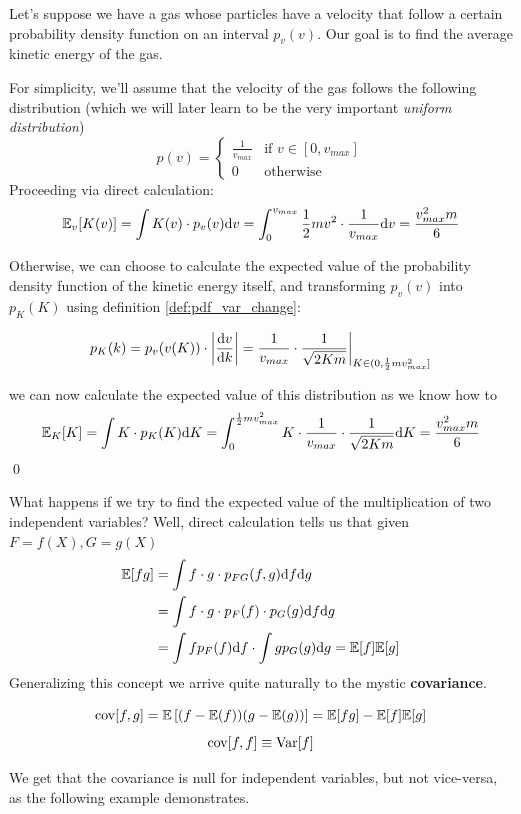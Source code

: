 \begin{example}
	Let's suppose we have a gas whose particles have a velocity that follow a certain probability density function on an interval $p_v(v)$. Our goal is to find the average kinetic energy of the gas. 
	
	For simplicity, we'll assume that the velocity of the gas follows the following distribution (which we will later learn to be the very important \emph{uniform distribution})
	\[
	p(v) = \begin{cases} \frac{1}{v_{max}} & \text{if } v \in [0,v_{max}] \\ 0 &  \text{otherwise} \end{cases}
	\]
	Proceeding via direct calculation:
	\[
	\mathbb{E}_v[K(v)] = \int K(v)\cdot p_v(v) \mathrm{d} v = \int_0^{v_{max}} \frac{1}{2}mv^2 \cdot \frac{1}{v_{max}} \mathrm{d} v = \frac{v_{max}^2m}{6}
	\]
	
	Otherwise, we can choose to calculate the expected value of the probability density function of the kinetic energy itself, and transforming $p_v(v)$ into $p_K(K)$ using definition \ref{def:pdf_var_change}:
	
	\[
	p_K(k) = p_v(v(K))\cdot \left| \frac{\mathrm{d} v}{\mathrm{d} k} \right| = \frac{1}{v_{max}}\cdot\frac{1}{\sqrt{2Km}}\bigg\rvert_{K\in(0,\frac{1}{2}mv_{max}^2]}
	\]
	
	we can now calculate the expected value of this distribution as we know how to
	\[
	\mathbb{E}_K[K] = \int K\cdot p_K(K) \mathrm{d} K = \int_0^{\frac{1}{2}mv_{max}^2} K \cdot \frac{1}{v_{max}}\cdot\frac{1}{\sqrt{2Km}} \mathrm{d} K = \frac{v_{max}^2m}{6}
	\]
	\qed
\end{example}

What happens if we try to find the expected value of the multiplication of two independent variables? Well, direct calculation tells us that given $F=f(X), G=g(X)$
\begin{align*}
	\mathbb{E}[fg] &= \int f\cdot g \cdot p_{FG}(f,g)\mathrm{d} f \mathrm{d} g \\
	&= \int f\cdot g \cdot p_F(f)\cdot p_G(g)\mathrm{d} f \mathrm{d} g \\
	&= \int f p_F(f) \mathrm{d} f \cdot\int g p_G(g)\mathrm{d} g = \mathbb{E}[f]\mathbb{E}[g]	
\end{align*}
Generalizing this concept we arrive quite naturally to the mystic \textbf{covariance}.
\begin{definition}[Covariance]
	\[
	\operatorname{cov}[f,g] = \mathbb{E}\left[ (f-\mathbb{E}(f))(g-\mathbb{E}(g))\right] = \mathbb{E}[fg] - \mathbb{E}[f]\mathbb{E}[g]
	\]
	\[
	\operatorname{cov}[f,f] \equiv \operatorname{Var}[f]
	\]
\end{definition}
We get that the covariance is null for independent variables, but not vice-versa, as the following example demonstrates.


